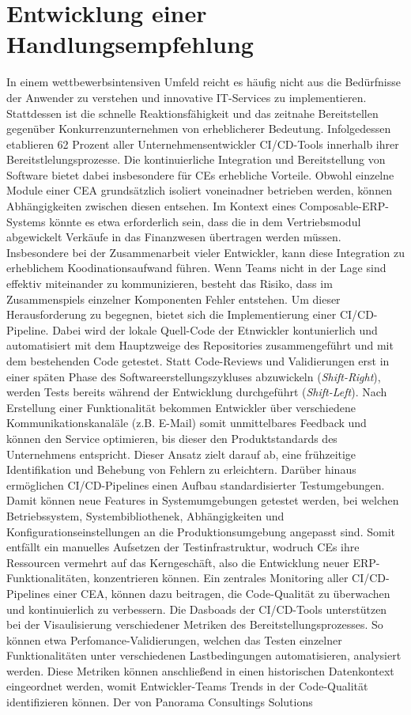 
\section{Entwicklung einer Handlungsempfehlung}
\label{sec:Handlungsempfehlung}
In einem wettbewerbsintensiven Umfeld reicht es häufig nicht aus die Bedürfnisse der Anwender zu verstehen und innovative IT-Services zu implementieren. Stattdessen ist die schnelle Reaktionsfähigkeit und das zeitnahe Bereitstellen gegenüber Konkurrenzunternehmen von erheblicherer Bedeutung. Infolgedessen etablieren 62 Prozent aller Unternehmensentwickler CI/CD-Tools innerhalb ihrer Bereitstlelungsprozesse. Die kontinuierliche Integration und Bereitstellung von Software bietet dabei insbesondere für CEs erhebliche Vorteile. Obwohl einzelne Module einer CEA grundsätzlich isoliert voneinadner betrieben werden, können Abhängigkeiten zwischen diesen entsehen. Im Kontext eines Composable-ERP-Systems könnte es etwa erforderlich sein, dass die in dem Vertriebsmodul abgewickelt Verkäufe in das Finanzwesen übertragen werden müssen. Insbesondere bei der Zusammenarbeit vieler Entwickler, kann diese Integration zu erheblichem Koodinationsaufwand führen. Wenn Teams nicht in der Lage sind effektiv miteinander zu kommunizieren, besteht das Risiko, dass im Zusammenspiels einzelner Komponenten Fehler entstehen. Um dieser Herausforderung zu begegnen, bietet sich die Implementierung einer CI/CD-Pipeline. Dabei wird der lokale Quell-Code der Etnwickler kontunierlich und automatisiert mit dem Hauptzweige des Repositories zusammengeführt und mit dem bestehenden Code getestet. Statt Code-Reviews und Validierungen erst in einer späten Phase des Softwareerstellungszykluses abzuwickeln (\textit{Shift-Right}), werden Tests bereits während der Entwicklung durchgeführt (\textit{Shift-Left}). Nach Erstellung einer Funktionalität bekommen Entwickler über verschiedene Kommunikationskanaläle (z.B. E-Mail) somit unmittelbares Feedback und können den Service optimieren, bis dieser den Produktstandards des Unternehmens entspricht. Dieser Ansatz zielt darauf ab, eine frühzeitige Identifikation und Behebung von Fehlern zu erleichtern. Darüber hinaus ermöglichen CI/CD-Pipelines einen Aufbau standardisierter Testumgebungen. Damit können neue Features in Systemumgebungen getestet werden, bei welchen Betriebssystem, Systembibliothenek, Abhängigkeiten und Konfigurationseinstellungen an die Produktionsumgebung angepasst sind. Somit entfällt ein manuelles Aufsetzen der Testinfrastruktur, wodruch CEs ihre Ressourcen vermehrt auf das Kerngeschäft, also die Entwicklung neuer ERP-Funktionalitäten, konzentrieren können. Ein zentrales Monitoring aller CI/CD-Pipelines einer CEA, können dazu beitragen, die Code-Qualität zu überwachen und kontinuierlich zu verbessern. Die Dasboads der CI/CD-Tools unterstützen bei der Visaulisierung verschiedener Metriken des Bereitstellungsprozesses. So können etwa Perfomance-Validierungen, welchen das Testen einzelner Funktionalitäten unter verschiedenen Lastbedingungen automatisieren, analysiert werden. Diese Metriken können anschließend in einen historischen Datenkontext eingeordnet werden, womit Entwickler-Teams Trends in der Code-Qualität identifizieren können. Der von Panorama Consultings Solutions 